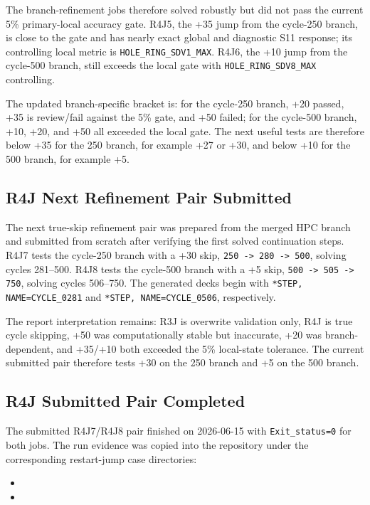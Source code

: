 \documentclass[11pt,a4paper]{article}
\newcommand{\code}[1]{\texttt{#1}}
\begin{document}
The branch-refinement jobs therefore solved robustly but did not pass the current 5\% primary-local accuracy gate. R4J5, the +35 jump from the cycle-250 branch, is close to the gate and has nearly exact global and diagnostic S11 response; its controlling local metric is \code{HOLE\_RING\_SDV1\_MAX}. R4J6, the +10 jump from the cycle-500 branch, still exceeds the local gate with \code{HOLE\_RING\_SDV8\_MAX} controlling.

The updated branch-specific bracket is: for the cycle-250 branch, +20 passed, +35 is review/fail against the 5\% gate, and +50 failed; for the cycle-500 branch, +10, +20, and +50 all exceeded the local gate. The next useful tests are therefore below +35 for the 250 branch, for example +27 or +30, and below +10 for the 500 branch, for example +5.

\subsection{R4J Next Refinement Pair Submitted}

The next true-skip refinement pair was prepared from the merged HPC branch and submitted from scratch after verifying the first solved continuation steps. R4J7 tests the cycle-250 branch with a +30 skip, \code{250 -> 280 -> 500}, solving cycles 281--500. R4J8 tests the cycle-500 branch with a +5 skip, \code{500 -> 505 -> 750}, solving cycles 506--750. The generated decks begin with \code{*STEP, NAME=CYCLE\_0281} and \code{*STEP, NAME=CYCLE\_0506}, respectively.

The report interpretation remains: R3J is overwrite validation only, R4J is true cycle skipping, +50 was computationally stable but inaccurate, +20 was branch-dependent, and +35/+10 both exceeded the 5\% local-state tolerance. The current submitted pair therefore tests +30 on the 250 branch and +5 on the 500 branch.

\subsection{R4J Submitted Pair Completed}

The submitted R4J7/R4J8 pair finished on 2026-06-15 with \code{Exit\_status=0} for both jobs. The run evidence was copied into the repository under the corresponding restart-jump case directories:

\begin{itemize}
  \item {}
  \item {}
\end{itemize}
\end{document}
